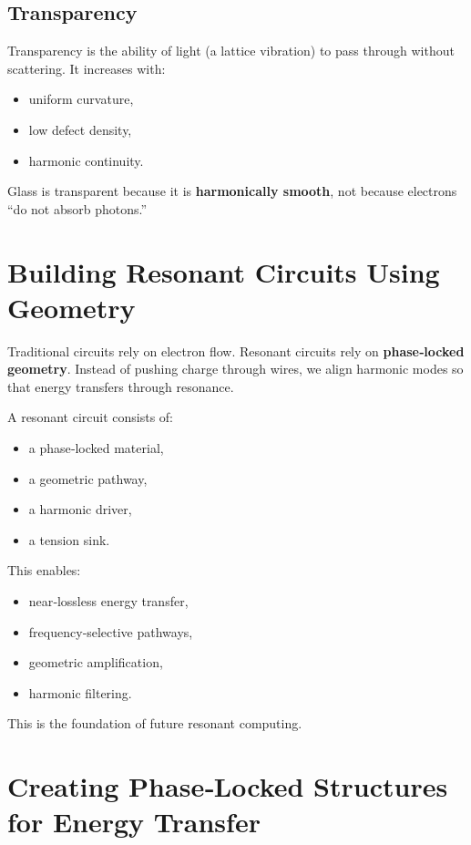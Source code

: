 \documentclass[11pt, letterpaper, openany]{book}
\begin{document}
\subsection*{Transparency}

Transparency is the ability of light (a lattice vibration) to pass through without scattering.
It increases with:

\begin{itemize}
    \item uniform curvature,
    \item low defect density,
    \item harmonic continuity.
\end{itemize}

Glass is transparent because it is \textbf{harmonically smooth}, not because electrons “do not
absorb photons.”

\section{Building Resonant Circuits Using Geometry}

Traditional circuits rely on electron flow. Resonant circuits rely on \textbf{phase‑locked
geometry}. Instead of pushing charge through wires, we align harmonic modes so that
energy transfers through resonance.

A resonant circuit consists of:

\begin{itemize}
    \item a phase‑locked material,
    \item a geometric pathway,
    \item a harmonic driver,
    \item a tension sink.
\end{itemize}

This enables:

\begin{itemize}
    \item near‑lossless energy transfer,
    \item frequency‑selective pathways,
    \item geometric amplification,
    \item harmonic filtering.
\end{itemize}

This is the foundation of future resonant computing.

\section{Creating Phase‑Locked Structures for Energy Transfer}
\end{document}
